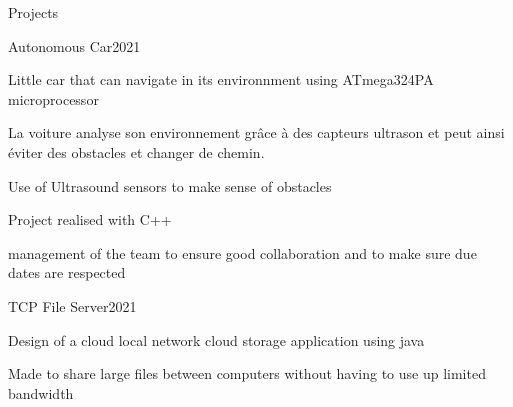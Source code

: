 \documentclass{resume} %
\begin{document}
	\begin{rSection}{Projects}
		\begin{rSubsection}{Autonomous Car}{2021}{}{}
			\item Little car that can navigate in its environnment using ATmega324PA microprocessor
			\item La voiture analyse son environnement grâce à des capteurs ultrason et peut ainsi éviter des obstacles et changer de chemin.
			\item Use of Ultrasound sensors to make sense of obstacles
			\item Project realised with C++
			\item management of the team to ensure good collaboration and to make sure due dates are respected
		 \end{rSubsection}

		 \begin{rSubsection}{TCP File Server}{2021}{}{}
			\item Design of a cloud local network cloud storage application using java
			\item Made to share large files between computers without having to use up limited bandwidth
		\end{rSubsection}

		
	\end{rSection}
	
\end{document}
